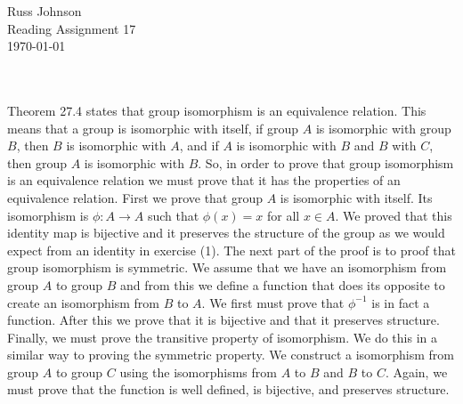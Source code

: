 \documentclass[11pt,a4paper]{article}
\begin{document}
\begin{flushright}
Russ Johnson\\
Reading Assignment 17\\
\today\\
\end{flushright}
~\\
~\\
Theorem 27.4 states that group isomorphism is an equivalence relation. This means that a group is isomorphic with itself, if group $A$ is isomorphic with group $B$, then $B$ is isomorphic with $A$, and if $A$ is isomorphic with $B$ and $B$ with $C$, then group $A$ is isomorphic with $B$. So, in order to prove that group isomorphism is an equivalence relation we must prove that it has the properties of an equivalence relation. First we prove that group $A$ is isomorphic with itself. Its isomorphism is $\phi: A \rightarrow A$ such that $\phi(x) = x$ for all $x\in A$. We proved that this identity map is bijective and it preserves the structure of the group as we would expect from an identity in exercise (1). The next part of the proof is to proof that group isomorphism is symmetric. We assume that we have an isomorphism from group $A$ to group $B$ and from this we define a function that does its opposite to create an isomorphism from $B$ to $A$. We first must prove that $\phi^{-1}$ is in fact a function. After this we prove that it is bijective and that it preserves structure. Finally, we must prove the transitive property of isomorphism.  We do this in a similar way to proving the symmetric property. We construct a isomorphism from group $A$ to group $C$ using the isomorphisms from $A$ to $B$ and $B$ to $C$. Again, we must prove that the function is well defined, is bijective, and preserves structure.
\end{document}
